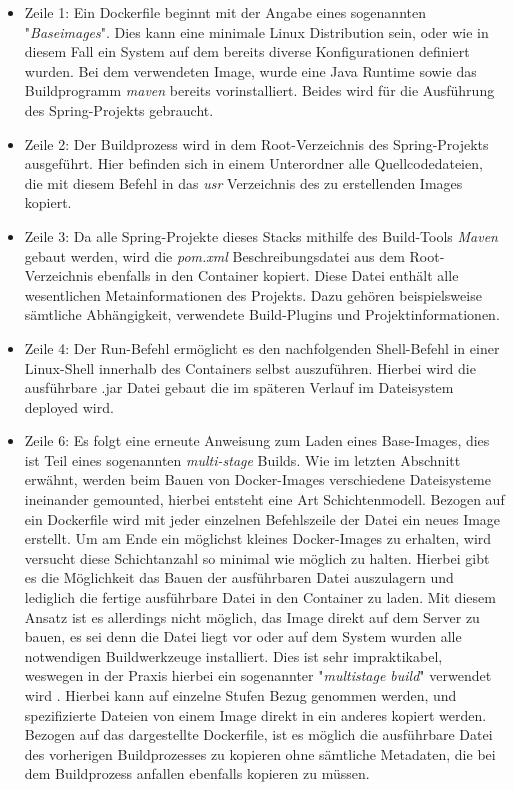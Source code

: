 \begin{itemize}
  \item Zeile 1: Ein Dockerfile beginnt mit der Angabe eines sogenannten "\emph{Baseimages}". Dies kann eine minimale Linux Distribution sein, oder wie in diesem Fall ein System auf dem bereits diverse Konfigurationen definiert wurden. Bei dem verwendeten Image, wurde eine Java Runtime sowie das Buildprogramm \emph{maven} bereits vorinstalliert. Beides wird für die Ausführung des Spring-Projekts gebraucht. 
  \item Zeile 2: Der Buildprozess wird in dem Root-Verzeichnis des Spring-Projekts ausgeführt. Hier befinden sich in einem Unterordner alle Quellcodedateien, die mit diesem Befehl in das \emph{usr} Verzeichnis des zu erstellenden Images kopiert. 
  \item Zeile 3: Da alle Spring-Projekte dieses Stacks mithilfe des Build-Tools \emph{Maven} gebaut werden, wird die \emph{pom.xml} Beschreibungsdatei aus dem Root-Verzeichnis ebenfalls in den Container kopiert. Diese Datei enthält alle wesentlichen Metainformationen des Projekts. Dazu gehören beispielsweise sämtliche Abhängigkeit, verwendete Build-Plugins und Projektinformationen. 
  \item Zeile 4: Der Run-Befehl ermöglicht es den nachfolgenden Shell-Befehl in einer Linux-Shell innerhalb des Containers selbst auszuführen. Hierbei wird die ausführbare .jar Datei gebaut die im späteren Verlauf im Dateisystem deployed wird.
  \item Zeile 6: Es folgt eine erneute Anweisung zum Laden eines Base-Images, dies ist Teil eines sogenannten \emph{multi-stage} Builds. Wie im letzten Abschnitt erwähnt, werden beim Bauen von Docker-Images verschiedene Dateisysteme ineinander gemounted, hierbei entsteht eine Art Schichtenmodell. Bezogen auf ein Dockerfile wird mit jeder einzelnen Befehlszeile der Datei ein neues Image erstellt. Um  am Ende ein möglichst kleines Docker-Images zu erhalten, wird versucht diese Schichtanzahl so minimal wie möglich zu halten. Hierbei gibt es die Möglichkeit das Bauen der ausführbaren Datei auszulagern und lediglich die fertige ausführbare Datei in den Container zu laden. Mit diesem Ansatz ist es allerdings nicht möglich, das Image direkt auf dem Server zu bauen, es sei denn die Datei liegt vor oder auf dem System wurden alle notwendigen Buildwerkzeuge installiert. Dies ist sehr impraktikabel, weswegen in der Praxis hierbei ein sogenannter "\emph{multistage build}" verwendet wird \cite[Kapitel~multi stage build]{docker-doc}. Hierbei kann auf einzelne Stufen Bezug genommen werden, und spezifizierte Dateien von einem Image direkt in ein anderes kopiert werden. Bezogen auf das dargestellte Dockerfile, ist es möglich die ausführbare Datei des vorherigen Buildprozesses zu kopieren ohne sämtliche Metadaten, die bei dem Buildprozess anfallen ebenfalls kopieren zu müssen.

\end{itemize}
